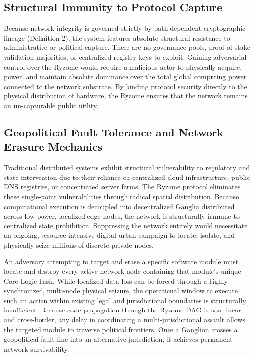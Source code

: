 \documentclass{article}
\begin{document}
\subsection{Structural Immunity to Protocol Capture}
Because network integrity is governed strictly by path-dependent cryptographic lineage (Definition 2), the system features absolute structural resistance to administrative or political capture. There are no governance pools, proof-of-stake validation majorities, or centralized registry keys to exploit. Gaining adversarial control over the Ryzome would require a malicious actor to physically acquire, power, and maintain absolute dominance over the total global computing power connected to the network substrate. By binding protocol security directly to the physical distribution of hardware, the Ryzome ensures that the network remains an un-capturable public utility.

\subsection{Geopolitical Fault-Tolerance and Network Erasure Mechanics}
Traditional distributed systems exhibit structural vulnerability to regulatory and state intervention due to their reliance on centralized cloud infrastructure, public DNS registries, or concentrated server farms. The Ryzome protocol eliminates these single-point vulnerabilities through radical spatial distribution. Because computational execution is decoupled into decentralized Ganglia distributed across low-power, localized edge nodes, the network is structurally immune to centralized state prohibition. Suppressing the network entirely would necessitate an ongoing, resource-intensive digital urban campaign to locate, isolate, and physically seize millions of discrete private nodes.

An adversary attempting to target and erase a specific software module must locate and destroy every active network node containing that module's unique Core Logic hash. While localized data loss can be forced through a highly synchronized, multi-node physical seizure, the operational window to execute such an action within existing legal and jurisdictional boundaries is structurally insufficient. Because code propagation through the Ryzome DAG is non-linear and cross-border, any delay in coordinating a multi-jurisdictional assault allows the targeted module to traverse political frontiers. Once a Ganglion crosses a geopolitical fault line into an alternative jurisdiction, it achieves permanent network survivability.
\end{document}
